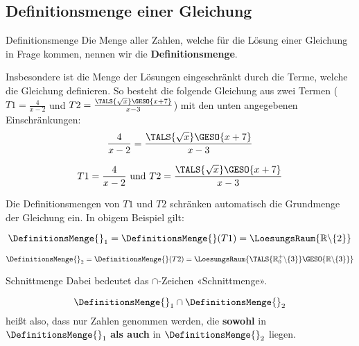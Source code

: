 \subsection{Definitionsmenge einer
    Gleichung}

\begin{definition}{Definitionsmenge}{}  Die Menge aller Zahlen, welche für die Lösung einer Gleichung in Frage kommen,
  nennen wir die \textbf{Definitionsmenge}.
\end{definition}

  Insbesondere ist die Menge der Lösungen eingeschränkt durch
  die Terme, welche die Gleichung definieren. So besteht die folgende
  Gleichung aus zwei Termen ($T1=\frac{4}{x-2}$ und $T2=\frac{\TALS{\sqrt{x}}\GESO{x+7}}{x-3}$) mit den unten angegebenen
  Einschränkungen:
  $$\frac{4}{x-2}=\frac{\TALS{\sqrt{x}}\GESO{x+7}}{x-3}$$

$$T1=\frac{4}{x-2} \text{ und } T2=\frac{\TALS{\sqrt{x}}\GESO{x+7}}{x-3}$$
  
  Die Definitionsmengen von $T1$ und $T2$ schränken automatisch die
  Grundmenge der Gleichung ein. In obigem Beispiel gilt:
  
  $$\DefinitionsMenge{}_1=\DefinitionsMenge{}(T1)=\LoesungsRaum{\mathbb{R}\backslash\{2\}}$$

  $$\DefinitionsMenge{}_2=\DefinitionsMenge{}(T2)=\LoesungsRaum{\TALS{\mathbb{R}^+_0\backslash\{3\}}\GESO{\mathbb{R}\backslash{}\{3\}}}$$

  

  \begin{bemerkung}{Schnittmenge}{}
    Dabei bedeutet das $\cap$-Zeichen «Schnittmenge».

    $$\DefinitionsMenge{}_1\cap\DefinitionsMenge{}_2$$
    heißt also, dass nur Zahlen genommen werden, die \textbf{sowohl}
    in $\DefinitionsMenge{}_1$ \textbf{als auch} in $\DefinitionsMenge{}_2$ liegen.
    \end{bemerkung}

  \newpage
